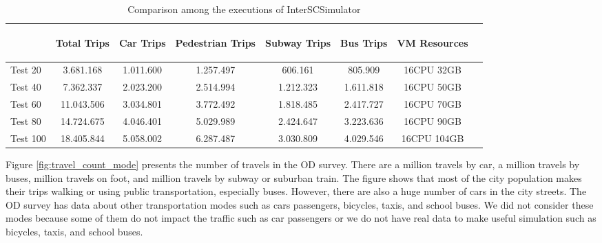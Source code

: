 \begin{table}[!htb]
\centering
{%
\begin{tabular}{|l|c|c|c|c|c|c|c|}
\hline

& \begin{sideways}Total Trips \end{sideways} 
& \begin{sideways}Car Trips \end{sideways} 
& \begin{sideways}Pedestrian Trips\hspace{0.5cm} \end{sideways} 
& \begin{sideways}Subway Trips \end{sideways} 
& \begin{sideways}Bus Trips \end{sideways} 
& \begin{sideways}VM Resources \hspace{1cm}\end{sideways} 
\\
\hline
Test 20
& 3.681.168 & 1.011.600 & 1.257.497 & 606.161 & 805.909 & 16CPU 32GB\\
Test 40
& 7.362.337 & 2.023.200 & 2.514.994 & 1.212.323 & 1.611.818 & 16CPU 50GB \\
Test 60
& 11.043.506 & 3.034.801 & 3.772.492 & 1.818.485 & 2.417.727 & 16CPU 70GB\\
Test 80
& 14.724.675 & 4.046.401 & 5.029.989 & 2.424.647 & 3.223.636  & 16CPU 90GB \\
Test 100
& 18.405.844 & 5.058.002 & 6.287.487 & 3.030.809 & 4.029.546  & 16CPU 104GB \\
\hline
\end{tabular}}
\caption{Comparison among the executions of InterSCSimulator\label{table:comparacao_experimentos}}
\end{table}%

Figure \ref{fig:travel_count_mode} presents the number of travels in the OD survey. There are a million travels by car, a million travels by buses,  million travels on foot, and million travels by subway or suburban train. The figure shows that most of the city population makes their trips walking or using public transportation, especially buses. However, there are also a huge number of cars in the city streets. The OD survey has data about other transportation modes such as cars passengers, bicycles, taxis, and school buses. We did not consider these modes because some of them do not impact the traffic such as car passengers or we do not have real data to make useful simulation such as bicycles, taxis, and school buses.

